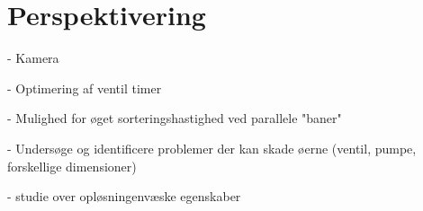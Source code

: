 \chapter{Perspektivering}
- Kamera

- Optimering af ventil timer

- Mulighed for øget sorteringshastighed ved parallele "baner" 

- Undersøge og identificere problemer der kan skade øerne (ventil, pumpe, forskellige dimensioner)

- studie over opløsningenvæske egenskaber
